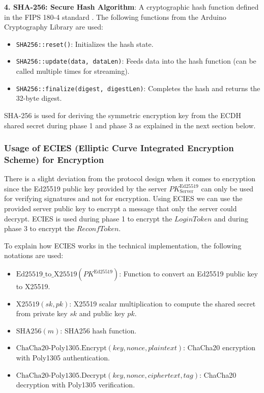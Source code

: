 \textbf{4. SHA-256: Secure Hash Algorithm}: A cryptographic hash function defined in the FIPS 180-4 standard \cite{fips180_4}. The following functions from the Arduino Cryptography Library are used:
\begin{itemize}
    \item \texttt{SHA256::reset()}: Initializes the hash state.
    \item \texttt{SHA256::update(data, dataLen)}: Feeds data into the hash function (can be called multiple times for streaming).
    \item \texttt{SHA256::finalize(digest, digestLen)}: Completes the hash and returns the 32-byte digest.
\end{itemize}
SHA-256 is used for deriving the symmetric encryption key from the ECDH shared secret during phase 1 and phase 3 as explained in the next section below.




\subsubsection{Usage of ECIES (Elliptic Curve Integrated Encryption Scheme) for Encryption}
There is a slight deviation from the protocol design when it comes to encryption since the Ed25519 public key provided by the server $PK_{\text{Server}}^{\text{Ed25519}}$ can only be used for verifying signatures and not for encryption. Using ECIES we can use the provided server public key to encrypt a message that only the server could decrypt. ECIES is used during phase 1 to encrypt the $LoginToken$ and during phase 3 to encrypt the $ReconfToken$.

To explain how ECIES works in the technical implementation, the following notations are used:
\begin{itemize}
    \item $\text{Ed25519\_to\_X25519}(PK^{\text{Ed25519}})$: Function to convert an Ed25519 public key to X25519.
    \item $\text{X25519}(sk, pk)$: X25519 scalar multiplication to compute the shared secret from private key $sk$ and public key $pk$.
    \item $\text{SHA256}(m)$: SHA256 hash function.
    \item $\text{ChaCha20-Poly1305.Encrypt}(key, nonce, plaintext)$: ChaCha20 encryption with Poly1305 authentication.
    \item $\text{ChaCha20-Poly1305.Decrypt}(key, nonce, ciphertext, tag)$: ChaCha20 decryption with Poly1305 verification.
\end{itemize}

